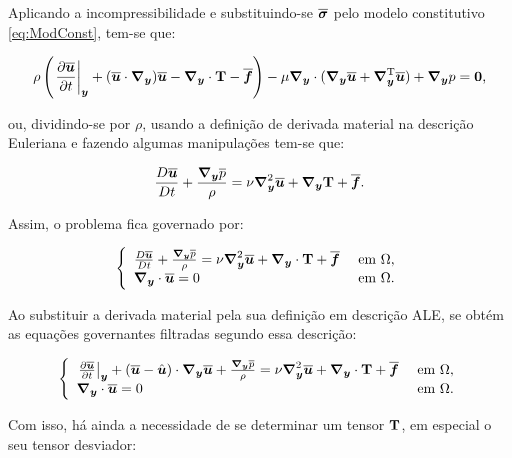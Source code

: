 Aplicando a incompressibilidade e substituindo-se $\bar{\tens}$ pelo modelo constitutivo \eqref{eq:ModConst}, tem-se que:

\begin{equation}
    \rho\bigpar{\dTime{\BBB{u}}+(\BBB{u}\cdot\Ny)\BBB{u}-\Ny\cdot\TS{T}-\BBB{f}}-\mu\Ny\cdot(\Ny\BBB{u}+\NyT\BBB{u})+\Ny p=\BB{0}\text{,}\label{eq:ConMasLES}
\end{equation}

\noindent ou, dividindo-se por $\rho$, usando a definição de derivada material na descrição Euleriana e fazendo algumas manipulações tem-se que:

\begin{equation}
    \frac{D\BBB{u}}{Dt}+\frac{\Ny\bar{p}}{\rho}=\nu\Lapl\BBB{u}+\Ny\TS{T}+\BBB{f}\text{.}
\end{equation}


Assim, o problema fica governado por:

\begin{equation}
    \left\{
    \begin{array}{ll}
        \frac{D\BBB{u}}{Dt}+\frac{\Ny\bar{p}}{\rho}=\nu\Lapl\BBB{u}+\Ny\cdot\TS{T}+\BBB{f} & \text{ em }\Omega\text{,} \\
        \Ny\cdot\BBB{u}=0                                                                  & \text{ em }\Omega\text{.}
    \end{array}
    \right.
\end{equation}

Ao substituir a derivada material pela sua definição em descrição ALE, se obtém as equações governantes filtradas segundo essa descrição:

\begin{equation}
    \left\{
    \begin{array}{ll}
        \dTime{\BBB{u}}+(\BBB{u}-\uhat)\cdot\Ny\BBB{u}+\frac{\Ny\bar{p}}{\rho}=\nu\Lapl\BBB{u}+\Ny\cdot\TS{T}+\BBB{f} & \text{ em }\Omega\text{,} \\
        \Ny\cdot\BBB{u}=0                                                                                             & \text{ em }\Omega\text{.}
    \end{array}
    \right.
\end{equation}

Com isso, há ainda a necessidade de se determinar um tensor $\TS{T}$, em especial o seu tensor desviador:

